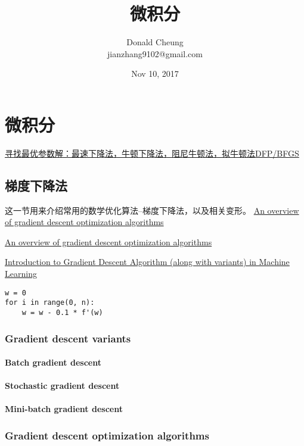 \documentclass[10pt,a4paper]{ctexbook}
\begin{document}
    \setlength{\baselineskip}{20pt}
    \title{微积分}
    \author{Donald Cheung\\jianzhang9102@gmail.com}
    \date{Nov 10, 2017}
    \tableofcontents
\fi

\chapter{微积分}
\href{http://dataunion.org/20714.html}{寻找最优参数解：最速下降法，牛顿下降法，阻尼牛顿法，拟牛顿法DFP/BFGS}


\section{梯度下降法}
这一节用来介绍常用的数学优化算法--梯度下降法，以及相关变形。
\href{https://arxiv.org/abs/1609.04747}{An overview of gradient descent optimization algorithms}

\href{http://ruder.io/optimizing-gradient-descent}{An overview of gradient descent optimization algorithms}

\href{https://www.analyticsvidhya.com/blog/2017/03/introduction-to-gradient-descent-algorithm-along-its-variants}{Introduction to Gradient Descent Algorithm (along with variants) in Machine Learning}

\begin{verbatim}
w = 0
for i in range(0, n):
    w = w - 0.1 * f'(w)
\end{verbatim}

\subsection{Gradient descent variants}
\subsubsection{Batch gradient descent}
\subsubsection{Stochastic gradient descent}
\subsubsection{Mini-batch gradient descent}

\subsection{Gradient descent optimization algorithms}
\end{document}
